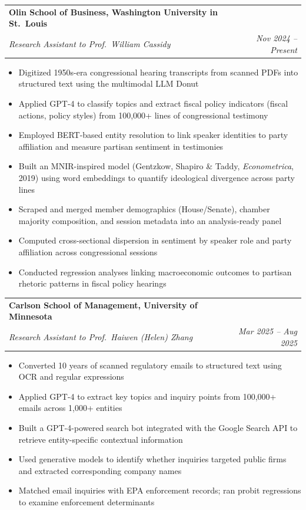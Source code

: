 \documentclass[letterpaper,11pt]{article}
\makeatletter
\newcommand{\resumeItem}[1]{
  \item\small{#1 \vspace{-2pt}}
}
\newcommand{\resumeSubheading}[4]{
  \vspace{-2pt}\item
    \begin{tabular*}{0.97\textwidth}[t]{l@{\extracolsep{\fill}}r}
      \textbf{#1} & \small #2 \\
      \textit{\small#3} & \textit{\small #4} \\
    \end{tabular*}\vspace{-7pt}
}
\newcommand{\resumeItemListStart}{\begin{itemize}}
\newcommand{\resumeItemListEnd}{\end{itemize}\vspace{-5pt}}
\makeatother
\begin{document}
  \resumeSubheading
    {Olin School of Business, Washington University in St.\ Louis}{}
    {Research Assistant to Prof.\ William Cassidy \normalfont{(Empirical Macro-Finance)}}{Nov 2024 -- Present}
    \resumeItemListStart
      \resumeItem{Digitized 1950s-era congressional hearing transcripts from scanned PDFs into structured text using the multimodal LLM Donut}
      \resumeItem{Applied GPT-4 to classify topics and extract fiscal policy indicators (fiscal actions, policy styles) from 100,000+ lines of congressional testimony}
      \resumeItem{Employed BERT-based entity resolution to link speaker identities to party affiliation and measure partisan sentiment in testimonies}
      \resumeItem{Built an MNIR-inspired model (Gentzkow, Shapiro \& Taddy, \textit{Econometrica}, 2019) using word embeddings to quantify ideological divergence across party lines}
      \resumeItem{Scraped and merged member demographics (House/Senate), chamber majority composition, and session metadata into an analysis-ready panel}
      \resumeItem{Computed cross-sectional dispersion in sentiment by speaker role and party affiliation across congressional sessions}
      \resumeItem{Conducted regression analyses linking macroeconomic outcomes to partisan rhetoric patterns in fiscal policy hearings}
    \resumeItemListEnd

  \resumeSubheading
    {Carlson School of Management, University of Minnesota}{}
    {Research Assistant to Prof.\ Haiwen (Helen) Zhang \normalfont{(Environmental Enforcement)}}{Mar 2025 -- Aug 2025}
    \resumeItemListStart
      \resumeItem{Converted 10 years of scanned regulatory emails to structured text using OCR and regular expressions}
      \resumeItem{Applied GPT-4 to extract key topics and inquiry points from 100,000+ emails across 1,000+ entities}
      \resumeItem{Built a GPT-4-powered search bot integrated with the Google Search API to retrieve entity-specific contextual information}
      \resumeItem{Used generative models to identify whether inquiries targeted public firms and extracted corresponding company names}
      \resumeItem{Matched email inquiries with EPA enforcement records; ran probit regressions to examine enforcement determinants}
    \resumeItemListEnd
\end{document}
